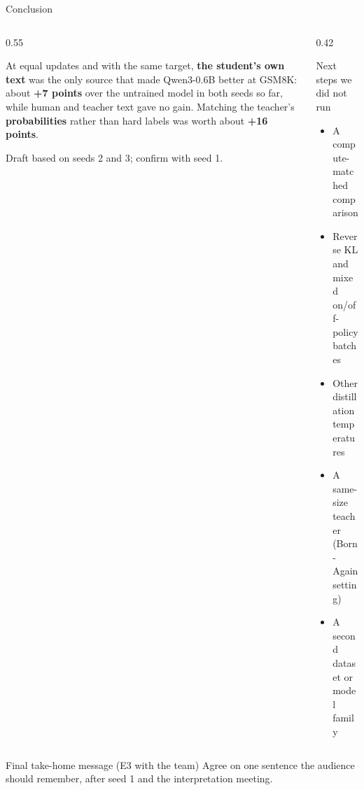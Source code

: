 \begin{frame}{Conclusion\hfill{}}
  \begin{columns}[T]
    \begin{column}{0.55\textwidth}
      \begin{keybox}
        \small At equal updates and with the same target, \textbf{the student's own text}
        was the only source that made Qwen3-0.6B better at GSM8K: about
        \textbf{+7 points} over the untrained model in both seeds so far, while human
        and teacher text gave no gain. Matching the teacher's \textbf{probabilities}
        rather than hard labels was worth about \textbf{+16 points}.
      \end{keybox}
      \vspace{0.1cm}
      {\scriptsize\color{kdgray} Draft based on seeds 2 and 3; confirm with seed 1.}
    \end{column}
    \begin{column}{0.42\textwidth}
      \begin{block}{Next steps we did not run}
        \footnotesize
        \begin{itemize}
          \item A compute-matched comparison
          \item Reverse KL and mixed on/off-policy batches
          \item Other distillation temperatures
          \item A same-size teacher (Born-Again setting)
          \item A second dataset or model family
        \end{itemize}
      \end{block}
    \end{column}
  \end{columns}
  \vspace{0.15cm}
  \begin{todobox}{Final take-home message (E3 with the team)}
    Agree on one sentence the audience should remember, after seed 1 and the interpretation meeting.
  \end{todobox}
\end{frame}

